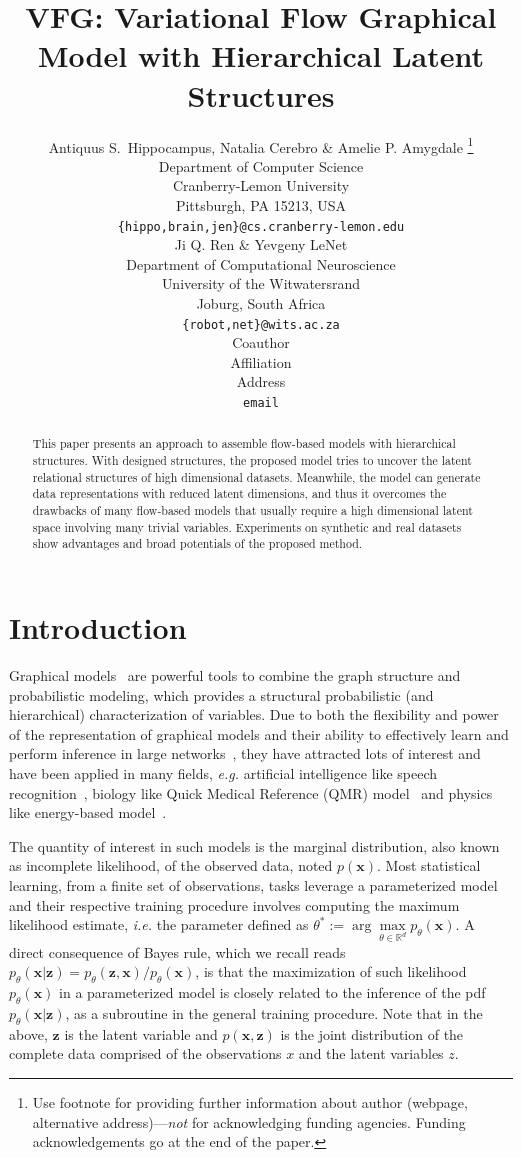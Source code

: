 \documentclass{article} %
\title{VFG: Variational Flow Graphical Model with Hierarchical Latent Structures\\
}
\author{Antiquus S.~Hippocampus, Natalia Cerebro \& Amelie P. Amygdale \thanks{ Use footnote for providing further information
about author (webpage, alternative address)---\emph{not} for acknowledging
funding agencies.  Funding acknowledgements go at the end of the paper.} \\
Department of Computer Science\\
Cranberry-Lemon University\\
Pittsburgh, PA 15213, USA \\
\texttt{\{hippo,brain,jen\}@cs.cranberry-lemon.edu} \\
\And
Ji Q. Ren \& Yevgeny LeNet \\
Department of Computational Neuroscience \\
University of the Witwatersrand \\
Joburg, South Africa \\
\texttt{\{robot,net\}@wits.ac.za} \\
\AND
Coauthor \\
Affiliation \\
Address \\
\texttt{email}
}
\begin{document}
\maketitle

\begin{abstract}
This paper presents an approach to  assemble flow-based models with hierarchical structures.  With  designed  structures, the proposed model tries to uncover the latent relational structures of  high dimensional datasets.  Meanwhile, the model can generate  data representations with reduced latent dimensions, and thus it overcomes the drawbacks of many flow-based models that usually require a high dimensional latent space involving many trivial variables.  Experiments on synthetic and real datasets show advantages and broad potentials of the proposed method. 
\end{abstract}


\section{Introduction}
Graphical models~\citep{madigan1995bayesian,hruschka2007bayesian} are powerful tools to combine the graph structure and probabilistic modeling, which provides a structural probabilistic (and hierarchical) characterization of variables. 
Due to both the flexibility and power of the representation of graphical models and their ability to effectively learn and
perform inference in large networks~\citep{koller2007graphical}, they have attracted lots of interest and have been applied in many fields, \textit{e.g.} artificial intelligence like speech recognition~\citep{bilmes2005graphical}, biology like Quick Medical Reference (QMR) model~\citep{shwe1990probabilistic} and physics like energy-based model~\citep{jordan1999graphical}.

The quantity of interest in such models is the marginal distribution, also known as incomplete likelihood, of the observed data, noted $p(\mathbf{x})$.
Most statistical learning, from a finite set of observations, tasks leverage a parameterized model and their respective training procedure involves computing the maximum likelihood estimate, \textit{i.e.} the parameter defined as $\theta^* :=  \arg \max \limits_{\theta \in \mathbb{R}^d} p_{\theta}(\mathbf{x})$.
A direct consequence of Bayes rule, which we recall reads $p_{\theta}(\mathbf{x}|\mathbf{z}) = p_{\theta}(\mathbf{z}, \mathbf{x}) / p_{\theta}(\mathbf{x})$, is that the maximization of such likelihood $p_{\theta}(\mathbf{x})$ in a parameterized model is closely related to the inference of the pdf $p_{\theta}(\mathbf{x}|\mathbf{z})$, as a subroutine in the general training procedure.
 Note that in the above, $\mathbf{z}$ is the latent variable and $p(\mathbf{x}, \mathbf{z})$ is the joint distribution of the complete data comprised of the observations $x$ and the latent variables $z$. 
\end{document}
